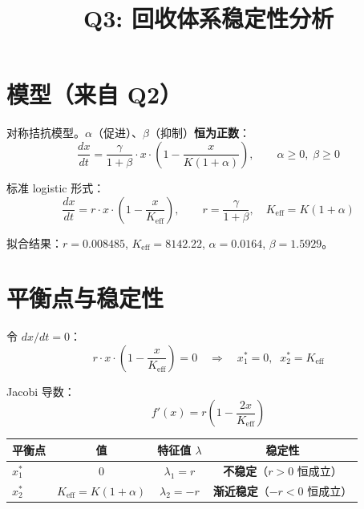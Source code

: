 \documentclass[12pt,a4paper]{article}
\title{Q3: 回收体系稳定性分析}
\author{}
\date{}
\begin{document}
\maketitle

\section{模型（来自 Q2）}

对称拮抗模型。$\alpha$（促进）、$\beta$（抑制）\textbf{恒为正数}：
\begin{equation}\label{eq:ode}
\frac{dx}{dt} = \frac{\gamma}{1+\beta} \cdot x \cdot \left(1 - \frac{x}{K(1+\alpha)}\right), \qquad \alpha \geq 0,\; \beta \geq 0
\end{equation}

标准 logistic 形式：
\begin{equation}\label{eq:logistic}
\frac{dx}{dt} = r \cdot x \cdot \left(1 - \frac{x}{K_{\text{eff}}}\right), \qquad
r = \frac{\gamma}{1+\beta}, \quad K_{\text{eff}} = K(1+\alpha)
\end{equation}

拟合结果：$r = 0.008485$, $K_{\text{eff}} = 8142.22$, $\alpha = 0.0164$, $\beta = 1.5929$。

\section{平衡点与稳定性}

令 $dx/dt = 0$：
\begin{equation}
r \cdot x \cdot \left(1 - \frac{x}{K_{\text{eff}}}\right) = 0
\quad\Rightarrow\quad x_1^* = 0,\;\; x_2^* = K_{\text{eff}}
\end{equation}

Jacobi 导数：
\begin{equation}
f'(x) = r\left(1 - \frac{2x}{K_{\text{eff}}}\right)
\end{equation}

\begin{center}
\begin{tabular}{lccc}
\toprule
平衡点 & 值 & 特征值 $\lambda$ & 稳定性 \\
\midrule
$x_1^*$ & $0$ & $\lambda_1 = r$ & \textbf{不稳定}（$r > 0$ 恒成立）\\
$x_2^*$ & $K_{\text{eff}} = K(1+\alpha)$ & $\lambda_2 = -r$ & \textbf{渐近稳定}（$-r < 0$ 恒成立）\\
\bottomrule
\end{tabular}
\end{center}
\end{document}
